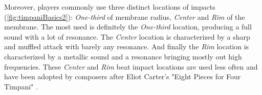 Moreover, players commonly use three distinct locations of impacts (\myfigname \ref{fig:timpaniBasics2}): \emph{One-third} of membrane radius, \emph{Center} and \emph{Rim} of the membrane. The most used is definitely the \emph{One-third} location, producing a full sound with a lot of resonance. The \emph{Center} location is characterized by a sharp and muffled attack with barely any resonance. And finally the \emph{Rim} location is characterized by a metallic sound and a resonance bringing mostly out high frequencies. These \emph{Center} and \emph{Rim} beat impact locations are used less often and have been adopted by composers after Eliot Carter's "Eight Pieces for Four Timpani" .\\

\begin{figure}%
	\begin{center}
		\hspace{6mm}
		\\

\end{center}
\end{figure}
